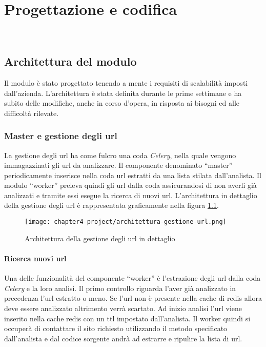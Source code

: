 
\chapter{Progettazione e codifica}
\label{cap:progettazione-codifica}

\\

\section{Architettura del modulo}

Il modulo è stato progettato tenendo a mente i requisiti di scalabilità imposti dall’azienda. L’architettura è stata definita durante le prime settimane e ha subito delle modifiche, anche in corso d’opera, in risposta ai bisogni ed alle difficoltà rilevate.

\subsection{Master e gestione degli url}

La gestione degli url ha come fulcro una coda \emph{Celery}, nella quale vengono immagazzinati gli url da analizzare. Il componente denominato ``master'' periodicamente inserisce nella coda url estratti da una lista stilata dall’analista. Il modulo ``worker'' preleva quindi gli url dalla coda assicurandosi di non averli già analizzati e tramite essi esegue la ricerca di nuovi url.  L'architettura in dettaglio della gestione degli url è rappresentata graficamente nella figura \ref{fig:architettura gestione url}.


\begin{figure}[!h] 
    \centering 
    \texttt{[image: chapter4-project/architettura-gestione-url.png]} 
    \caption{Architettura della gestione degli url in dettaglio}
    \label{fig:architettura gestione url}
\end{figure}
\newpage{}

\subsubsection{Ricerca nuovi url}
Una delle funzionalità del componente ``worker'' è l’estrazione degli url dalla coda \emph{Celery} e la loro analisi. Il primo controllo riguarda l’aver già analizzato in precedenza l’url estratto o meno. Se l’url non è presente nella cache di redis allora deve essere analizzato altrimento verrà scartato. Ad inizio analisi l’url viene inserito nella cache redis con un \gls{ttl} impostato dall’analista. Il worker quindi si occuperà di contattare il sito richiesto utilizzando il metodo specificato dall’analista e dal codice sorgente andrà ad estrarre e ripulire la lista di url. 


